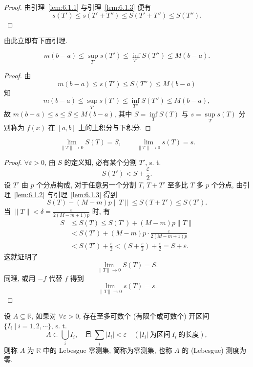 \begin{proof}
由引理~\ref{lem:6.1.1} 与引理~\ref{lem:6.1.3} 便有
\[
s(T')\leqslant s(T'+T'')\leqslant S(T'+T'')\leqslant S(T'').
\]
\end{proof}

由此立即有下面引理.

\begin{lemma}\label{lem:6.1.5}
\[
m(b-a)\leqslant\sup_{T'}s(T')\leqslant\inf_{T''}S(T'')\leqslant M(b-a).
\]
\end{lemma}

\begin{proof}
由
\[
m(b-a)\leqslant s(T')\leqslant S(T'')\leqslant M(b-a)
\]
知
\[
m(b-a)\leqslant\sup_{T'}s(T')\leqslant\inf_{T''}S(T'')\leqslant M(b-a),
\]
故 $m(b-a)\leqslant s\leqslant S\leqslant M(b-a)$, 其中 $S=\inf\limits_{T}S(T)$ 与 $s=\sup\limits_{T}s(T)$ 分别称为 $f(x)$ 在 $[a,b]$ 上的上积分与下积分.
\end{proof}

\begin{theorem}[Darboux 定理]\label{thm:6.1.3}
\[
\lim_{\|T\|\to 0}S(T)=S,\qquad \lim_{\|T\|\to 0}s(T)=s.
\]
\end{theorem}

\begin{proof}
$\forall\varepsilon>0$, 由 $S$ 的定义知, 必有某个分割 $T'$, s. t.
\[
S(T')<S+\frac{\varepsilon}{2}.
\]
设 $T'$ 由 $p$ 个分点构成, 对于任意另一个分割 $T$, $T+T'$ 至多比 $T$ 多 $p$ 个分点, 由引理~\ref{lem:6.1.2} 与引理~\ref{lem:6.1.3} 得到
\[
S(T)-(M-m)p\|T\|\leqslant S(T+T')\leqslant S(T').
\]
当 $\|T\|<\delta=\frac{\varepsilon}{2(M-m+1)p}$ 时, 有
\begin{align*}
S&\leqslant S(T)\leqslant S(T')+(M-m)p\|T\|\\
&<S(T')+(M-m)p\cdot\frac{\varepsilon}{2(M-m+1)p}\\
&<S(T')+\frac{\varepsilon}{2}<\left(S+\frac{\varepsilon}{2}\right)+\frac{\varepsilon}{2}=S+\varepsilon.
\end{align*}
这就证明了
\[
\lim_{\|T\|\to 0}S(T)=S.
\]
同理, 或用 $-f$ 代替 $f$ 得到
\[
\lim_{\|T\|\to 0}s(T)=s.
\]
\end{proof}

\begin{definition}\label{def:6.1.2}
设 $A\subseteq\mathbb{R}$, 如果对 $\forall\varepsilon>0$, 存在至多可数个 (有限个或可数个) 开区间 $\{I_{i}\mid i=1,2,\cdots\}$, s. t.
\[
A\subset\bigcup_{i}I_{i},\quad\text{且}\ \sum_{i}|I_{i}|<\varepsilon\quad(|I_{i}|\ \text{为区间}\ I_{i}\ \text{的长度}),
\]
则称 $A$ 为 $\mathbb{R}$ 中的 Lebesgue 零测集, 简称为零测集, 也称 $A$ 的 (Lebesgue) 测度为零.
\end{definition}

